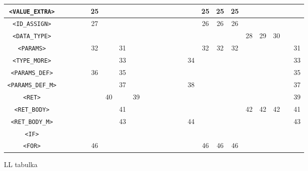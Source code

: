 \documentclass[czech,a4paper,12pt]{article}[]
\begin{document}
\begin{figure}[h!]
\begin{adjustbox}{scale=0.65,angle=90,center}
\begin{tabular}{| c |  c | c | c | c | c | c | c | c | c | c | c | c | c | c | c | c | c | c | c | c | c | c | c |}
                   \texttt{<VALUE\_EXTRA>}  &    &    &    &    & 25 &    &    &    &    &    &    &    &    &    &    & 25 & 25 & 25 &    &    &    & &  \\\hline
                   \texttt{<ID\_ASSIGN>}    &    &    &    &    & 27 &    &    &    &    &    &    &    &    &    &    & 26 & 26 & 26 &    &    &    & &  \\\hline
                   \texttt{<DATA\_TYPE>}    &    &    &    &    &    &    &    &    &    &    &    &    &    &    &    &    &    &    & 28 & 29 & 30 & &  \\\hline
                   \texttt{<PARAMS>}        &    &    &    &    & 32 &    & 31 &    &    &    &    &    &    &    &    & 32 & 32 & 32 &    &    &    & & 31 \\\hline
                   \texttt{<TYPE\_MORE>}    &    &    &    &    &    &    & 33 &    &    &    &    &    &    &    & 34 &    &    &    &    &    &    & & 33 \\\hline
                   \texttt{<PARAMS\_DEF>}   &    &    &    &    & 36 &    & 35 &    &    &    &    &    &    &    &    &    &    &    &    &    &    & & 35 \\\hline
                   \texttt{<PARAMS\_DEF\_M>}&    &    &    &    &    &    & 37 &    &    &    &    &    &    &    & 38 &    &    &    &    &    &    & & 37 \\\hline
                   \texttt{<RET>}           &    &    &    &    &    & 40 &    & 39 &    &    &    &    &    &    &    &    &    &    &    &    &    & & 39 \\\hline
                   \texttt{<RET\_BODY>}     &    &    &    &    &    &    & 41 &    &    &    &    &    &    &    &    &    &    &    & 42 & 42 & 42 & & 41 \\\hline
                   \texttt{<RET\_BODY\_M>}  &    &    &    &    &    &    & 43 &    &    &    &    &    &    &    & 44 &    &    &    &    &    &    & & 43 \\\hline
                   \texttt{<IF>}            &    &    &    &    &    &    &    &    &    &    &    &    &    &    &    &    &    &    &    &    &    & &  \\\hline
                   \texttt{<FOR>}           &    &    &    &    & 46 &    &    &    &    &    &    &    &    &    &    & 46 & 46 & 46 &    &    &    & &  \\\hline
                \end{tabular}
            \end{adjustbox}
            \label{lltabulka}
            \caption{LL tabulka}
        \end{figure}


\newpage
        
        \renewcommand{\refname}{Zdroje}
        
\end{document}
